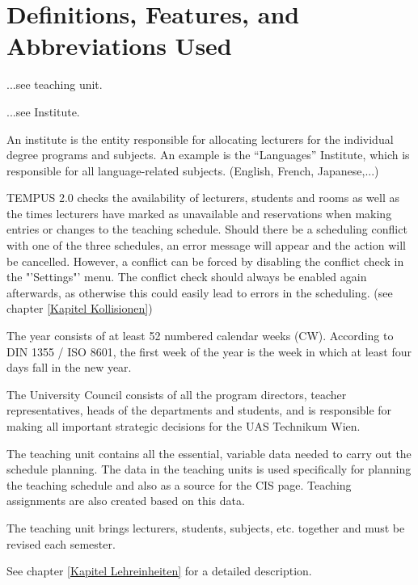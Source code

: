 \chapter{Definitions, Features, and Abbreviations Used}
\label{Kapitel Begriffe} 

...see teaching unit.
	
...see Institute.

An institute is the entity responsible for allocating lecturers for the individual degree programs and subjects.
An example is the "`Languages"' Institute, which is responsible for all language-related subjects. (English, French, Japanese,...)

	{
TEMPUS\raisebox{1ex}{\tiny\copyright} 2.0 checks the availability of lecturers, students and rooms as well as the times lecturers have marked as unavailable and reservations when making entries or changes to the teaching schedule. Should there be a scheduling conflict with one of the three schedules, an error message will appear and the action will be cancelled.
However, a conflict can be forced by disabling the conflict check in the "'Settings"' menu. The conflict check should always be enabled again afterwards, as otherwise this could easily lead to errors in the scheduling. (see chapter \ref{Kapitel Kollisionen})

The year consists of at least 52 numbered calendar weeks (CW). According to DIN 1355 / ISO 8601, the first week of the year is the week in which at least four days fall in the new year. 

The University Council consists of all the program directors, teacher representatives, heads of the departments and students, and is responsible for making all important strategic decisions for the UAS Technikum Wien.
	
The teaching unit contains all the essential, variable data needed to carry out the schedule planning. The data in the teaching units is used specifically for planning the teaching schedule and also as a source for the CIS page. Teaching assignments are also created based on this data. 

The teaching unit brings lecturers, students, subjects, etc. together and must be revised each semester.

See chapter \ref{Kapitel Lehreinheiten} for a detailed description.

}
